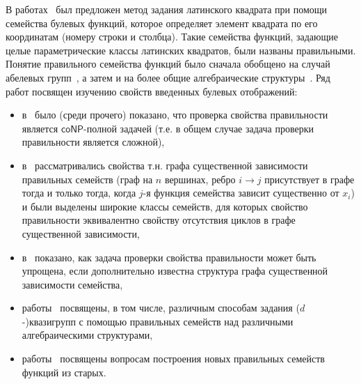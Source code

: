    В работах~\autocite{nosov98, nosov99} был предложен метод задания латинского квадрата при помощи семейства булевых функций, которое определяет элемент квадрата по его координатам (номеру строки и столбца).
    Такие семейства функций, задающие целые параметрические классы латинских квадратов, были названы правильными.
    Понятие правильного семейства функций было сначала обобщено на случай абелевых групп~\autocite{nosov06, nosov06abel, nosov07, nosov08, kozlov08}, а затем и на более общие алгебраические структуры~\autocite{plaksina14, galatenko2020latin}.
    Ряд работ посвящен изучению свойств введенных булевых отображений:
    \begin{itemize}
        \item в~\autocite{nosov98} было (среди прочего) показано, что проверка свойства правильности является $\mathsf{coNP}$-полной задачей (т.е. в общем случае задача проверки правильности является сложной),
        \item в~\autocite{nosov07, nosov08, kozlov08} рассматривались свойства т.н. графа существенной зависимости правильных семейств (граф на $n$ вершинах, ребро $ i \to j$ присутствует в графе тогда и только тогда, когда $j$-я функция семейства зависит существенно от $x_i$) и были выделены широкие классы семейств, для которых свойство правильности эквивалентно свойству отсутствия циклов в графе существенной зависимости,
        \item в~\autocite{rykov10, rykov14} показано, как задача проверки свойства правильности может быть упрощена, если дополнительно известна структура графа существенной зависимости семейства,
        \item работы~\autocite{plaksina14, galatenko2020latin} посвящены, в том числе, различным способам задания \mbox{($d$-)квазигрупп} с помощью правильных семейств над различными алгебраическими структурами,
        \item работы~\autocite{galatenko21generation, galatenko2022generation} посвящены вопросам построения новых правильных семейств функций из старых.
    \end{itemize}

